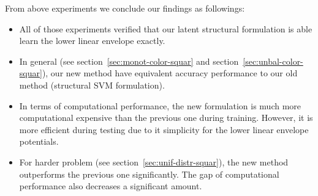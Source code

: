 From above experiments we conclude our findings as followings:

\begin{itemize}
\item All of those experiments verified that our latent
  structural formulation is able learn the lower linear envelope
  exactly.
\item In general (see section~\ref{sec:monot-color-squar} and
  section~\ref{sec:unbal-color-squar}), our new method have
  equivalent accuracy performance to our old method (structural
  SVM formulation\cite{Gould:ICML2011,gouldlearning}).
\item In terms of computational performance, the new formulation
  is much more computational expensive than the previous one
  during training. However, it is more efficient during testing
  due to it simplicity for the lower linear envelope potentials.
\item For harder problem (see
  section~\ref{sec:unif-distr-squar}), the new method outperforms
  the previous one significantly. The gap of computational
  performance also decreases a significant amount.
\end{itemize}

\clearpage
\cleardoublepage



